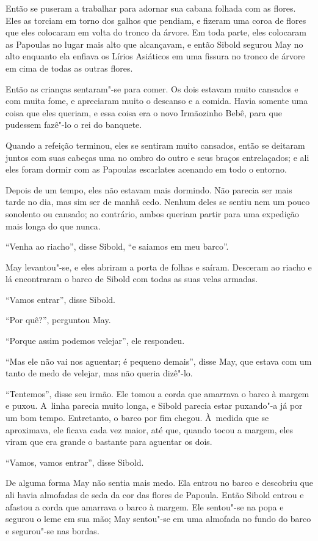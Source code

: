 Então se puseram a trabalhar para adornar sua cabana folhada com as
flores. Eles as torciam em torno dos galhos que pendiam, e fizeram uma
coroa de flores que eles colocaram em volta do tronco da árvore. Em toda
parte, eles colocaram as Papoulas no lugar mais alto que alcançavam, e
então Sibold segurou May no alto enquanto ela enfiava os Lírios
Asiáticos em uma fissura no tronco de árvore em cima de todas as outras
flores.

Então as crianças sentaram"-se para comer. Os dois estavam muito cansados
e com muita fome, e apreciaram muito o descanso e a comida. Havia
somente uma coisa que eles queriam, e essa coisa era o novo Irmãozinho
Bebê, para que pudessem fazê"-lo o rei do banquete.

Quando a refeição terminou, eles se sentiram muito cansados, então se
deitaram juntos com suas cabeças uma no ombro do outro e seus braços
entrelaçados; e ali eles foram dormir com as Papoulas escarlates
acenando em todo o entorno.


Depois de um tempo, eles não estavam mais dormindo. Não parecia ser mais
tarde no dia, mas sim ser de manhã cedo. Nenhum deles se sentiu nem um
pouco sonolento ou cansado; ao contrário, ambos queriam partir para uma
expedição mais longa do que nunca.

``Venha ao riacho'', disse Sibold, ``e saiamos em meu barco''.

May levantou"-se, e eles abriram a porta de folhas e saíram. Desceram ao
riacho e lá encontraram o barco de Sibold com todas as suas velas
armadas.

``Vamos entrar'', disse Sibold.

``Por quê?'', perguntou May.

``Porque assim podemos velejar'', ele respondeu.

``Mas ele não vai nos aguentar; é pequeno demais'', disse May, que
estava com um tanto de medo de velejar, mas não queria dizê"-lo.

``Tentemos'', disse seu irmão. Ele tomou a corda que amarrava o barco à
margem e puxou. A~linha parecia muito longa, e Sibold parecia estar
puxando"-a já por um bom tempo. Entretanto, o barco por fim chegou. À~medida que se aproximava, ele ficava cada vez maior, até que, quando
tocou a margem, eles viram que era grande o bastante para aguentar os
dois.

``Vamos, vamos entrar'', disse Sibold.

De alguma forma May não sentia mais medo. Ela entrou no barco e
descobriu que ali havia almofadas de seda da cor das flores de Papoula.
Então Sibold entrou e afastou a corda que amarrava o barco à margem. Ele
sentou"-se na popa e segurou o leme em sua mão; May sentou"-se em uma
almofada no fundo do barco e segurou"-se nas bordas.

